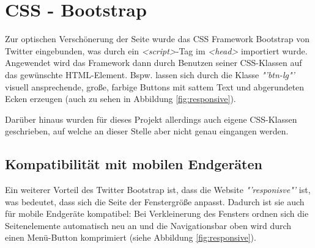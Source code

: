 \section{CSS - Bootstrap}
\label{CSS - Bootstrap}
Zur optischen Verschönerung der Seite wurde das CSS Framework Bootstrap von Twitter eingebunden, was durch ein \textit{<script>}-Tag im \textit{<head>} importiert wurde. Angewendet wird das Framework dann durch Benutzen seiner CSS-Klassen auf das gewünschte HTML-Element. Bspw. lassen sich durch die Klasse \textit{"'btn-lg"'} visuell ansprechende, große, farbige Buttons mit sattem Text und abgerundeten Ecken erzeugen (auch zu sehen in Abbildung \vref{fig:responsive}).
\par
Darüber hinaus wurden für dieses Projekt allerdings auch eigene CSS-Klassen geschrieben, auf welche an dieser Stelle aber nicht genau eingangen werden.

\subsection{Kompatibilität mit mobilen Endgeräten}
\label{Kompatibilität mit mobilen Endgeräten}
Ein weiterer Vorteil des Twitter Bootstrap ist, dass die Website \textit{"'responisve"'} ist, was bedeutet, dass sich die Seite der Fenstergröße anpasst. Dadurch ist sie auch für mobile Endgeräte kompatibel: Bei Verkleinerung des Fensters ordnen sich die Seitenelemente automatisch neu an und die Navigationsbar oben wird durch einen Menü-Button komprimiert (siehe Abbildung \vref{fig:responsive}).


